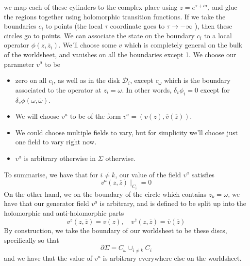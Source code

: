 \documentclass[11pt, oneside]{article}   	%
\theoremstyle{slanted}
\begin{document}
we map each of these cylinders 
to the complex place using $ z  = e ^{ \tau + i \sigma } $,
and glue the regions together 
using holomorphic transition functions. 
If we take the boundaries 
$ c _ i $ to points 
(the local $ \tau $ coordinate goes to $ \tau \to  - \infty $ ), 
then these circles go to points.
We can associate the state on the boundary 
$ c _ i $ to a local 
operator $ \phi \left( z, \overline{  z} _ i  \right)  $. 
We'll choose some $ v $ which is 
completely general on the bulk of the worldsheet, 
and vanishes on all the boundaries except 1. 
We choose our parameter 
$ v ^ a $ to be 
\begin{itemize}
	\item zero on all $ c _ i $, as well  
		as in the disk $ \mathcal{ D } _ i$, 
		except $ c _{ \omega } $ which is 
		the boundary associated to 
		the operator at $ z _ i  = \omega $. 
		In other words, $ \delta _ v \phi _ i   = 0 $
		except for $ \delta_ v \phi \left( \omega, 
		\overline{ \omega } \right)  $. 
	\item We will choose $ v ^ a $ to be 
		of the form $ v ^ a  = 
		\left( v \left( z  \right)  , \overline{ v } 
		\left( \overline{ z }  \right)  \right)  $. 
	\item We could choose multiple fields to vary, 
		but for simplicity we'll choose 
		just one field to vary right now. 
	\item  $ v ^ a $ is arbitrary otherwise in $ \Sigma $ 
		otherwise. 
\end{itemize}
To summarise, we have that 
for $ i \neq k$, our value of the field $ v ^ a $ satisfies 
 \[
    v ^  a \left( z, \overline{ z }  \right)  \mid _{ C _ i} =0 
\] On the other hand, we 
on the boundary of the circle 
which contains $ z _ k  = \omega $, 
we have that our generator field $ v ^ a $ is arbitrary, 
and is defined to be split up 
into the holomorphic and anti-holomorphic parts 
\[
	v ^{ z } \left( z, \overline{ z }  \right)   = v \left(  z  \right) , 
	\quad v ^{ \overline{ z } } \left( z, \overline{ z }  \right)   = 
	\overline{ v } \left( \overline{ z }  \right)  
\] By construction, we take the boundary of 
our worldsheet to be these discs, specifically so that 
\[
 \partial  \Sigma  = C _{ \omega } \cup _{ i \neq k  } C _ i 
\] and we have that the value of $ v ^ a $ 
is arbitrary everywhere else on the worldsheet. 
\end{document}
